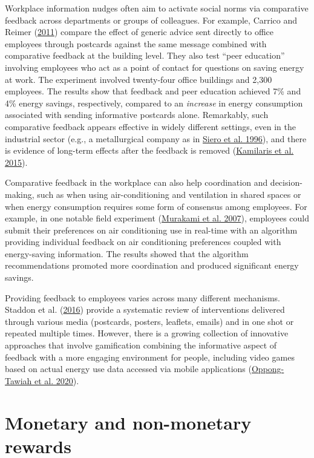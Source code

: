 \documentclass[
  11pt,
  captions=heading]{scrreport}
\begin{document}
Workplace information nudges often aim to activate social norms via
comparative feedback across departments or groups of colleagues. For
example, Carrico and Reimer
(\protect\hyperlink{ref-carrico2011motivating}{2011}) compare the effect
of generic advice sent directly to office employees through postcards
against the same message combined with comparative feedback at the
building level. They also test ``peer education'' involving employees
who act as a point of contact for questions on saving energy at work.
The experiment involved twenty-four office buildings and 2,300
employees. The results show that feedback and peer education achieved
7\% and 4\% energy savings, respectively, compared to an \emph{increase}
in energy consumption associated with sending informative postcards
alone. Remarkably, such comparative feedback appears effective in widely
different settings, even in the industrial sector (e.g., a metallurgical
company as in \protect\hyperlink{ref-siero1996changing}{Siero et al.
1996}), and there is evidence of long-term effects after the feedback is
removed (\protect\hyperlink{ref-kamilaris2015case}{Kamilaris et al.
2015}).

Comparative feedback in the workplace can also help coordination and
decision-making, such as when using air-conditioning and ventilation in
shared spaces or when energy consumption requires some form of consensus
among employees. For example, in one notable field experiment
(\protect\hyperlink{ref-murakami2007field}{Murakami et al. 2007}),
employees could submit their preferences on air conditioning use in
real-time with an algorithm providing individual feedback on air
conditioning preferences coupled with energy-saving information. The
results showed that the algorithm recommendations promoted more
coordination and produced significant energy savings.

Providing feedback to employees varies across many different mechanisms.
Staddon et al. (\protect\hyperlink{ref-staddon2016intervening}{2016})
provide a systematic review of interventions delivered through various
media (postcards, posters, leaflets, emails) and in one shot or repeated
multiple times. However, there is a growing collection of innovative
approaches that involve gamification combining the informative aspect of
feedback with a more engaging environment for people, including video
games based on actual energy use data accessed via mobile applications
(\protect\hyperlink{ref-oppong2020developing}{Oppong-Tawiah et al.
2020}).

\hypertarget{monetary-and-non-monetary-rewards}{%
\section{Monetary and non-monetary
rewards}\label{monetary-and-non-monetary-rewards}}
\end{document}
